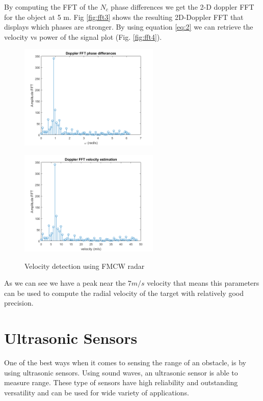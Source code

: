 By computing the FFT of the $N_c$ phase differences we get the 2-D doppler \ac{FFT}  for the object at 5 m.  Fig \ref{fig:fft3} shows the resulting  2D-Doppler FFT that displays which phases are stronger. By using equation \ref{eq:2} we can retrieve the velocity vs power of the signal plot (Fig. \ref{fig:fft4}). 
\begin{figure}[ht] 
    \begin{minipage}[b]{.49\linewidth}
        \includegraphics[height=5cm,width=\linewidth]{imgs/chapter2/fft3.png}
        \label{fig:fft3}
    \end{minipage}
    \begin{minipage}[b]{.49\linewidth}
        \includegraphics[height=5cm,width=\linewidth]{imgs/chapter2/fft4.png}
        \label{fig:fft4}
    \end{minipage}
    \caption{Velocity detection using \ac{FMCW} \ac{radar}}
    \label{fig:velocitydetermination}
\end{figure}
As we can see we have a peak near the $7 m/s$ velocity that means this parameters can be used to compute the radial velocity of the target with relatively good precision. 



\section{Ultrasonic Sensors}
One of the best ways when it comes to  sensing the range of an obstacle, is by using ultrasonic sensors. Using sound waves, an ultrasonic sensor is able to measure range. 
These type of sensors have high reliability and outstanding versatility and can be used for wide variety of applications. 

